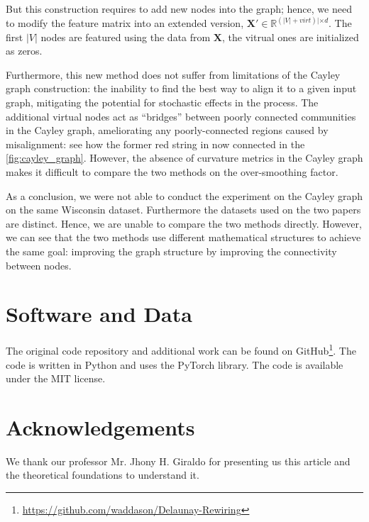 \documentclass{article}
\theoremstyle{plain}
\theoremstyle{definition}
\theoremstyle{remark}
\begin{document}
But this construction requires to add new nodes into the graph; hence, we need to modify the feature
matrix into an extended version, $\mathbf{X}' \in \mathbb{R}^{(|V| + virt)| \times d}$.
The first $|V|$ nodes are featured using the data from $\mathbf{X}$, the vitrual 
ones are initialized as zeros.


Furthermore, this new method does not suffer from limitations of the Cayley graph construction:
the inability to find the best way to align it to a given input graph, mitigating the potential for
stochastic effects in the process. The additional virtual nodes act as “bridges” between poorly
connected communities in the Cayley graph, ameliorating any poorly-connected regions caused by
misalignment: see how the former red string in now connected in the \cref{fig:cayley_graph}.
However, the absence of curvature metrics in the Cayley graph makes it difficult to compare the two methods
on the over-smoothing factor.

As a conclusion, we were not able to conduct the experiment on the Cayley graph
on the same Wisconsin dataset. Furthermore the datasets used on the two papers are distinct.
Hence, we are unable to compare the two methods directly. However, we can see that the two methods
use different mathematical structures to achieve the same goal: improving the graph structure
by improving the connectivity between nodes.





\section*{Software and Data}

The original code repository and additional work can be found on GitHub\footnote{ 
\url{https://github.com/waddason/Delaunay-Rewiring}}.
The code is written in Python and uses the PyTorch library. The code is available under the MIT license.

\section*{Acknowledgements}

We thank our professor Mr. Jhony H. Giraldo for presenting us this article and 
the theoretical foundations to understand it.
\end{document}
